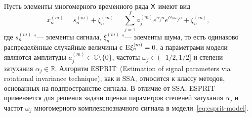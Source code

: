 \documentclass[specialist,
  substylefile=spbu_report.rtx,
subf,href,colorlinks=true, 12pt]{disser}
\theoremstyle{plain}
\theoremstyle{definition}
\theoremstyle{remark}
\newtheorem{remark}{Замечание}[section]
\newcommand{\iu}{\mathrm{i}}
\begin{document}
Пусть элементы многомерного временного ряда $\mathsf{X}$ имеют вид
\begin{equation}
  \label{eq:esprit-model}
  x_n^{(m)} = s_n^{(m)} + \xi_n^{(m)} = \sum_{j=1}^{J} a_j^{(m)} e^{
  \alpha_j n }
  e^{\iu 2 \pi \omega_j n} + \xi_n^{(m)},
\end{equation}
где $s_n^{(m)}$ "--- элементы сигнала, $\xi_n^{(m)}$ "--- элементы
шума, то есть одинаково распределённые случайные величины с
$\mathrm{E}\xi_n^{(m)} = 0$, а параметрами модели являются амплитуды
$a_j^{(m)} \in \mathbb{C}\setminus\{0\}$, частоты $\omega_j\in (-1/2,
1/2]$ и степени затухания $\alpha_j \in \mathbb{R}$.
Алгоритм ESPRIT~(Estimation of signal parameters via rotational
invariance tech\-nique),
как и SSA, относится к классу методов, основанных на подпространстве сигнала.
В отличие от SSA, ESPRIT применяется для решения задачи оценки параметров
степеней затухания $\alpha_j$ и частот $\omega_j$ многомерного
комплекснозначного сигнала в модели~\eqref{eq:esprit-model}.
\end{document}

